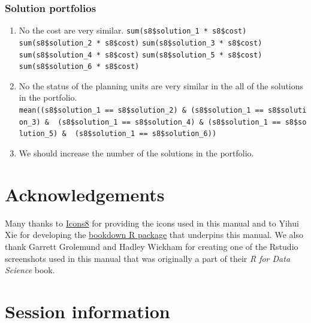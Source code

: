 \documentclass[12pt,]{book}
\makeatletter
\providecommand{\tightlist}{%
  \setlength{\itemsep}{0pt}\setlength{\parskip}{0pt}}
\newenvironment{kframe}{%
\medskip{}
\setlength{\fboxsep}{.8em}
 \def\at@end@of@kframe{}%
 \ifinner\ifhmode%
  \def\at@end@of@kframe{\end{minipage}}%
  \begin{minipage}{\columnwidth}%
 \fi\fi%
 \def\FrameCommand##1{\hskip\@totalleftmargin \hskip-\fboxsep
 \colorbox{shadecolor}{##1}\hskip-\fboxsep
     \hskip-\linewidth \hskip-\@totalleftmargin \hskip\columnwidth}%
 \MakeFramed {\advance\hsize-\width
   \@totalleftmargin\z@ \linewidth\hsize
   \@setminipage}}%
 {\par\unskip\endMakeFramed%
 \at@end@of@kframe}
\newenvironment{rmdblock}[1]
  {
  \begin{itemize}
  \renewcommand{\labelitemi}{
    \raisebox{-.7\height}[0pt][0pt]{
      {\setkeys{Gin}{width=3em,keepaspectratio}\texttt{[image: images/\#1]}}
    }
  }
  \setlength{\fboxsep}{1em}
  \begin{kframe}
  \item
  }
  {
  \end{kframe}
  \end{itemize}
  }
\newenvironment{rmdanswer}
  {\begin{rmdblock}{answer}}
  {\end{rmdblock}}
\makeatother
\begin{document}
\clearpage

\hypertarget{solution-portfolios-1}{%
\subsection{Solution portfolios}\label{solution-portfolios-1}}

\begin{rmdanswer}
\begin{enumerate}
\def\labelenumi{\arabic{enumi}.}
\tightlist
\item
  No the cost are very similar. \newline
  \texttt{sum(s8\$solution\_1\ *\ s8\$cost)} \newline
  \texttt{sum(s8\$solution\_2\ *\ s8\$cost)} \newline
  \texttt{sum(s8\$solution\_3\ *\ s8\$cost)} \newline
  \texttt{sum(s8\$solution\_4\ *\ s8\$cost)} \newline
  \texttt{sum(s8\$solution\_5\ *\ s8\$cost)} \newline
  \texttt{sum(s8\$solution\_6\ *\ s8\$cost)}
\item
  No the status of the planning units are very similar in the all of the solutions in the portfolio. \newline
  \texttt{mean((s8\$solution\_1\ ==\ s8\$solution\_2)\ \&\ (s8\$solution\_1\ ==\ s8\$solution\_3)\ \&\ \ (s8\$solution\_1\ ==\ s8\$solution\_4)\ \&\ (s8\$solution\_1\ ==\ s8\$solution\_5)\ \&\ \ (s8\$solution\_1\ ==\ s8\$solution\_6))}
\item
  We should increase the number of the solutions in the portfolio.
\end{enumerate}
\end{rmdanswer}

\hypertarget{acknowledgements}{%
\chapter{Acknowledgements}\label{acknowledgements}}

Many thanks to \href{https://icons8.com}{Icons8} for providing the icons used in this manual and to Yihui Xie for developing the \href{http://bookdown.org}{bookdown R package} that underpins this manual. We also thank Garrett Grolemund and Hadley Wickham for creating one of the Rstudio screenshots used in this manual that was originally a part of their \emph{R for Data Science} book.

\hypertarget{session-information}{%
\chapter{Session information}\label{session-information}}
\end{document}
